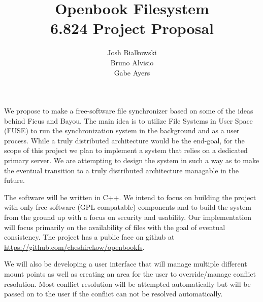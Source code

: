 \documentclass{article}
\title
{%
   Openbook Filesystem \\
   \small 6.824 Project Proposal
}
\author
{%
   \small Josh Bialkowski \\
   \small Bruno Alvisio \\
   \small Gabe Ayers
}
\begin{document}
\maketitle

We propose to make a free-software file synchronizer based on some of the ideas 
behind Ficus and Bayou. The main idea is to utilize File Systems in User Space
(FUSE) to run the synchronization system in the background and as a user 
process. While a truly distributed architecture would be the end-goal, for the
scope of this project we plan to implement a system that relies on a dedicated
primary server. We are attempting to design the system in such a way as to make
the eventual transition to a truly distributed architecture managable in the
future. 

The software will be written in C++. We intend to focus on building the project
with only free-software (GPL compatable) components and to build the system 
from the ground up with a focus on security and usability. Our implementation 
will focus primarily on the availability of files with the goal of eventual
consistency. The project has a public face on github at 
\url{https://github.com/cheshirekow/openbookfs}.

We will also be developing a user interface that will manage multiple different
mount points as well as creating an area for the user to override/manage conflict
resolution. Most conflict resolution will be attempted automatically but will be
passed on to the user if the conflict can not be resolved automatically.
\end{document}

